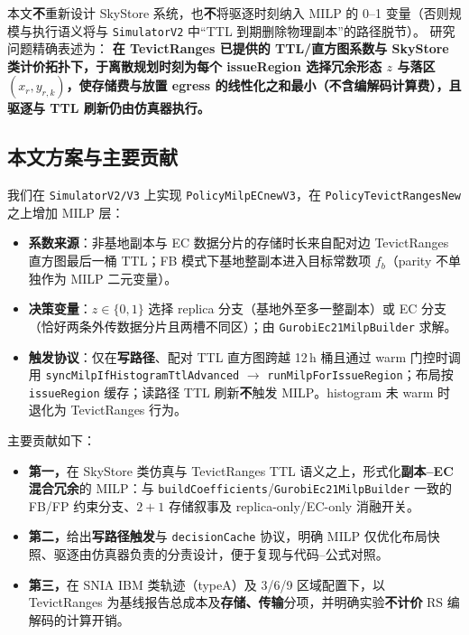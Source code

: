 \documentclass[conference]{IEEEtran}
\begin{document}
本文\textbf{不}重新设计 SkyStore 系统，也\textbf{不}将驱逐时刻纳入 MILP 的 0--1 变量（否则规模与执行语义将与 \texttt{SimulatorV2} 中``TTL 到期删除物理副本''的路径脱节）。
研究问题精确表述为：
\textbf{在 TevictRanges 已提供的 TTL/直方图系数与 SkyStore 类计价拓扑下，于离散规划时刻为每个 issueRegion 选择冗余形态 $z$ 与落区 $(x_r,y_{r,k})$，使\textbf{存储费与放置 egress} 的线性化之和最小（不含编解码计算费），且驱逐与 TTL 刷新仍由仿真器执行。}

\subsection{本文方案与主要贡献}

我们在 \texttt{SimulatorV2/V3} 上实现 \texttt{PolicyMilpECnewV3}，在 \texttt{PolicyTevictRangesNew} 之上增加 MILP 层：
\begin{itemize}
  \item \textbf{系数来源}：非基地副本与 EC 数据分片的存储时长来自配对边 TevictRanges 直方图最后一桶 TTL；FB 模式下基地整副本进入目标常数项 $f_b$（parity 不单独作为 MILP 二元变量）。
  \item \textbf{决策变量}：$z\in\{0,1\}$ 选择 replica 分支（基地外至多一整副本）或 EC 分支（恰好两条外传数据分片且两槽不同区）；由 \texttt{GurobiEc21MilpBuilder} 求解。
  \item \textbf{触发协议}：仅在\textbf{写路径}、配对 TTL 直方图跨越 12\,h 桶且通过 warm 门控时调用 \texttt{syncMilpIfHistogramTtlAdvanced} $\rightarrow$ \texttt{runMilpForIssueRegion}；布局按 \texttt{issueRegion} 缓存；读路径 TTL 刷新\textbf{不}触发 MILP。histogram 未 warm 时退化为 TevictRanges 行为。
\end{itemize}

主要贡献如下：
\begin{itemize}
  \item \textbf{第一，}在 SkyStore 类仿真与 TevictRanges TTL 语义之上，形式化\textbf{副本--EC 混合冗余}的 MILP：与 \texttt{buildCoefficients}/\texttt{GurobiEc21MilpBuilder} 一致的 FB/FP 约束分支、$2{+}1$ 存储叙事及 replica-only/EC-only 消融开关。
  \item \textbf{第二，}给出\textbf{写路径触发}与 \texttt{decisionCache} 协议，明确 MILP 仅优化布局快照、驱逐由仿真器负责的分责设计，便于复现与代码--公式对照。
  \item \textbf{第三，}在 SNIA IBM 类轨迹（typeA）及 3/6/9 区域配置下，以 TevictRanges 为基线报告总成本及\textbf{存储、传输}分项，并明确实验\textbf{不计价} RS 编解码的计算开销。
\end{itemize}
\end{document}
